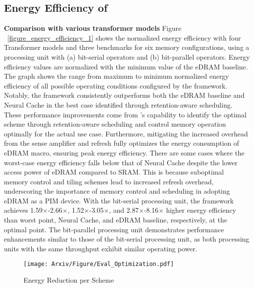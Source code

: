 \subsection{Energy Efficiency of \sysname}
\textbf{Comparison with various transformer models}
Figure ~\ref{figure_energy_efficiency_1} shows the normalized energy efficiency with four Transformer models and three benchmarks for six memory configurations, using a processing unit with (a) bit-serial operators and (b) bit-parallel operators. Energy efficiency values are normalized with the minimum value of the eDRAM baseline. The graph shows the range from maximum to minimum normalized energy efficiency of all possible operating conditions configured by the \sysname framework. Notably, the framework consistently outperforms both the eDRAM baseline and Neural Cache in the best case identified through retention-aware scheduling. These performance improvements come from \sysname’s capability to identify the optimal scheme through retention-aware scheduling and control memory operation optimally for the actual use case. Furthermore, mitigating the increased overhead from the sense amplifier and refresh fully optimizes the energy consumption of eDRAM macro, ensuring peak energy efficiency. There are some cases where the worst-case energy efficiency falls below that of Neural Cache despite the lower access power of eDRAM compared to SRAM. This is because suboptimal memory control and tiling schemes lead to increased refresh overhead, underscoring the importance of memory control and scheduling in adopting eDRAM as a PIM device. With the bit-serial processing unit, the \sysname framework achieves 1.59$\times$-2.66$\times$, 1.52$\times$-3.05$\times$, and 2.87$\times$-8.16$\times$ higher energy efficiency than worst point, Neural Cache, and eDRAM baseline, respectively, at the optimal point. The bit-parallel processing unit demonstrates performance enhancements similar to those of the bit-serial processing unit, as both processing units with the same throughput exhibit similar operating power.

\begin{figure}[t]
\centering
\texttt{[image: Arxiv/Figure/Eval\_Optimization.pdf]}
\caption{Energy Reduction per Scheme}
\vspace{-0.1in}
\label{figure_optimization}
\end{figure}

